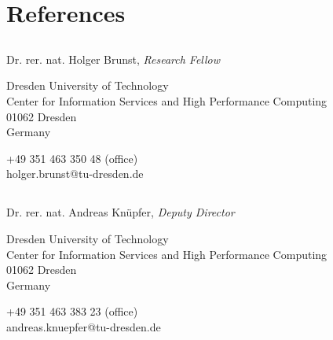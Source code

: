 



\pagestyle{empty}



\customhrule
\section*{References}

\subsection*{}

Dr. rer. nat. Holger Brunst, \emph{Research Fellow}
\vspace{0.25cm}

Dresden University of Technology \\
Center for Information Services and High Performance Computing \\
01062 Dresden \\
Germany
\vspace{0.25cm}

+49 351 463 350 48 (office) \\
holger.brunst@tu-dresden.de

\subsection*{}

Dr. rer. nat. Andreas Kn\"upfer, \emph{Deputy Director}
\vspace{0.25cm}

Dresden University of Technology \\
Center for Information Services and High Performance Computing \\
01062 Dresden \\
Germany
\vspace{0.25cm}

+49 351 463 383 23 (office) \\
andreas.knuepfer@tu-dresden.de


